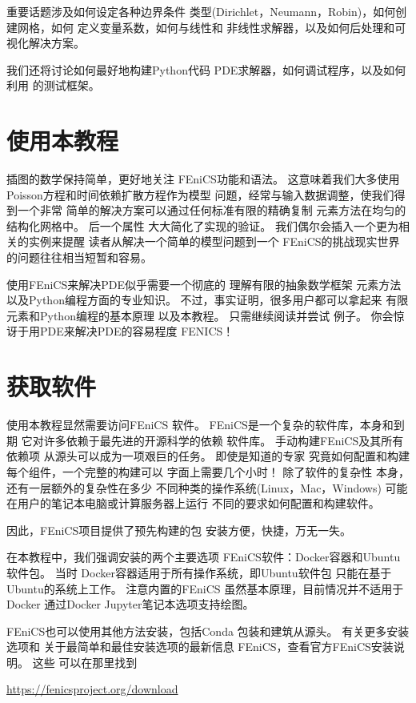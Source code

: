 \noindent
重要话题涉及如何设定各种边界条件
类型(Dirichlet，Neumann，Robin)，如何创建网格，如何
定义变量系数，如何与线性和
非线性求解器，以及如何后处理和可视化解决方案。

我们还将讨论如何最好地构建Python代码
PDE求解器，如何调试程序，以及如何利用
的测试框架。

\section{使用本教程}

插图的数学保持简单，更好地关注
FEniCS功能和语法。 这意味着我们大多使用
Poisson方程和时间依赖扩散方程作为模型
问题，经常与输入数据调整，使我们得到一个非常
简单的解决方案可以通过任何标准有限的精确复制
元素方法在均匀的结构化网格中。 后一个属性
大大简化了实现的验证。
我们偶尔会插入一个更为相关的实例来提醒
读者从解决一个简单的模型问题到一个
FEniCS的挑战现实世界的问题往往相当短暂和容易。

使用FEniCS来解决PDE似乎需要一个彻底的
理解有限的抽象数学框架
元素方法以及Python编程方面的专业知识。
不过，事实证明，很多用户都可以拿起来
有限元素和Python编程的基本原理
以及本教程。 只需继续阅读并尝试
例子。 你会惊讶于用PDE来解决PDE的容易程度
FENICS！

\section{获取软件}

使用本教程显然需要访问FEniCS
软件。 FEniCS是一个复杂的软件库，本身和到期
它对许多依赖于最先进的开源科学的依赖
软件库。 手动构建FEniCS及其所有依赖项
从源头可以成为一项艰巨的任务。 即使是知道的专家
究竟如何配置和构建每个组件，一个完整的构建可以
字面上需要几个小时！ 除了软件的复杂性
本身，还有一层额外的复杂性在多少
不同种类的操作系统(Linux，Mac，Windows)
可能在用户的笔记本电脑或计算服务器上运行
不同的要求如何配置和构建软件。


因此，FEniCS项目提供了预先构建的包
安装方便，快捷，万无一失。

\begin{notice}[FEniCS下载和安装]
在本教程中，我们强调安装的两个主要选项
FEniCS软件：Docker容器和Ubuntu软件包。 当时
Docker容器适用于所有操作系统，即Ubuntu软件包
只能在基于Ubuntu的系统上工作。 注意内置的FEniCS
虽然基本原理，目前情况并不适用于Docker
通过Docker Jupyter笔记本选项支持绘图。

FEniCS也可以使用其他方法安装，包括Conda
包装和建筑从源头。 有关更多安装选项和
关于最简单和最佳安装选项的最新信息
FEniCS，查看官方FEniCS安装说明。 这些
可以在那里找到
\begin{center}
  \url{https://fenicsproject.org/download}
\end{center}
\end{notice}

